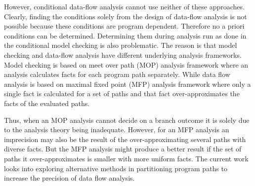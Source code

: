 However, conditional data-flow analysis cannot use neither of these approaches. Clearly, finding the conditions solely from the design of data-flow analysis is not possible because these conditions are program dependent. Therefore no a priori conditions can be determined. Determining them during analysis run as done in the conditional model checking is also problematic. The reason is that model checking and data-flow analysis have different underlying analysis frameworks. Model checking is based on meet over path (MOP) analysis framework where an analysis calculates facts for each program path separately. While data flow analysis is based on maximal fixed point (MFP) analysis framework where only a single fact is calculated for a set of paths and that fact over-approximates the facts of the evaluated paths.

Thus, when an MOP analysis cannot decide on a branch outcome it is solely due to the analysis theory being inadequate. However, for an MFP analysis an imprecision may also be the result of the over-approximating several paths with diverse facts. But the MFP analysis might produce a better result if the set of paths it over-approximates is smaller with more uniform facts. The current work looks into exploring alternative methods in partitioning program paths to increase the precision of data flow analysis.  





